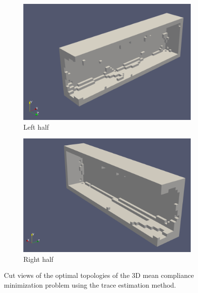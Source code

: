     \begin{figure}
      \begin{subfigure}[t]{0.45\textwidth}
        \centering
        \includegraphics[width=1\textwidth]{./images/robust_approx/trace_mean_1.png}
        \caption{Left half}
      \end{subfigure} \hfill
      \begin{subfigure}[t]{0.45\textwidth}
        \centering
        \includegraphics[width=1\textwidth]{./images/robust_approx/trace_mean_2.png}
        \caption{Right half}
      \end{subfigure}
      \caption{Cut views of the optimal topologies of the 3D mean compliance minimization problem using the trace estimation method.}
      \label{fig:trace_mean_3d}
    \end{figure}

